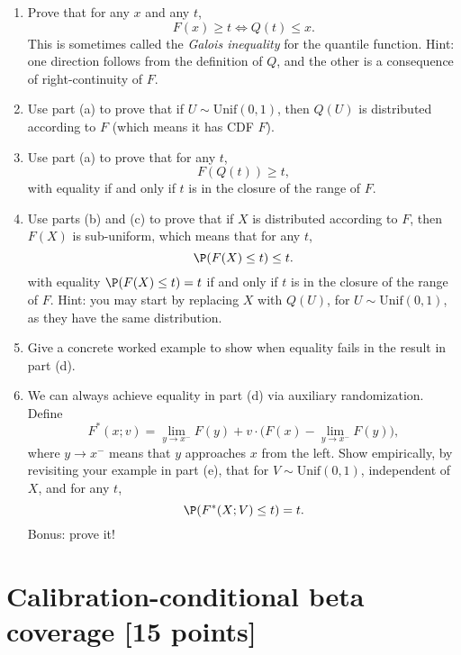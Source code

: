 \documentclass{article}
\begin{document}
\begin{enumerate}[label=(\alph*)]
\item Prove that for any $x$ and any $t$, 
  \marginpar{\small [3 pts]}
  \[
  F(x) \geq t \iff Q(t) \leq x.
  \]
  This is sometimes called the \emph{Galois inequality} for the quantile
  function. Hint: one direction follows from the definition of $Q$, and the
  other is a consequence of right-continuity of $F$.  

\item Use part (a) to prove that if $U \sim \mathrm{Unif}(0,1)$, then $Q(U)$ is
  distributed according to $F$ (which means it has CDF $F$).
  \marginpar{\small [2 pts]}

\item Use part (a) to prove that for any $t$, 
  \marginpar{\small [2 pts]}
  \[
  F(Q(t)) \geq t,
  \]
  with equality if and only if $t$ is in the closure of the range of $F$. 

\item Use parts (b) and (c) to prove that if $X$ is distributed according to
  $F$, then $F(X)$ is sub-uniform, which means that for any $t$, 
  \marginpar{\small [3 pts]}
  \[
  \P(F(X) \leq t) \leq t.
  \]
  with equality $\P(F(X) \leq t) = t$ if and only if $t$ is in the closure of
  the range of $F$. Hint: you may start by replacing $X$ with $Q(U)$, for $U
  \sim \mathrm{Unif}(0,1)$, as they have the same distribution.  
  
\item Give a concrete worked example to show when equality fails in the result  
  in part (d).
  \marginpar{\small [2 pts]}

\item We can always achieve equality in part (d) via auxiliary randomization.
  Define
  \[
  F^*(x; v) =  \lim_{y \to x^-} F(y) + v \cdot \Big( F(x) - \lim_{y \to x^-}
  F(y) \Big), 
  \]
  where $y \to x^-$ means that $y$ approaches $x$ from the left. Show
  empirically, by revisiting your example in part (e), that for $V \sim
  \mathrm{Unif}(0,1)$, independent of $X$, and for any $t$,      
  \marginpar{\small [2 pts]}
  \[
  \P(F^*(X; V) \leq t) = t.
  \]
  Bonus: prove it!
\end{enumerate}

\section{Calibration-conditional beta coverage [15 points]}

\def\hC{\hat{C}}
\end{document}
